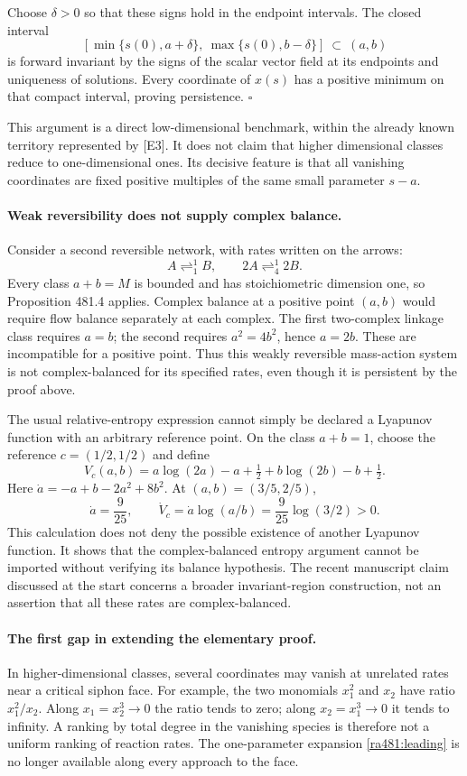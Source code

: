 \documentclass[11pt]{article}
\begin{document}
Choose $\delta>0$ so that these signs hold in the endpoint intervals.
The closed interval
\[
 [\min\{s(0),a+\delta\},\ \max\{s(0),b-\delta\}]
 \ \subset\ (a,b)
\]
is forward invariant by the signs of the scalar vector field at its
endpoints and uniqueness of solutions. Every coordinate of $x(s)$ has
a positive minimum on that compact interval, proving persistence.
\hfill$\square$

This argument is a direct low-dimensional benchmark, within the already
known territory represented by [E3]. It does not claim that higher
dimensional classes reduce to one-dimensional ones. Its decisive feature
is that all vanishing coordinates are fixed positive multiples of the
same small parameter $s-a$.

\paragraph{Weak reversibility does not supply complex balance.}
Consider a second reversible network, with rates written on the arrows:
\[
 A\mathop{\rightleftharpoons}^{1}_{1}B,
 \qquad
 2A\mathop{\rightleftharpoons}^{1}_{4}2B.
\]
Every class $a+b=M$ is bounded and has stoichiometric dimension one, so
Proposition 481.4 applies. Complex balance at a positive point $(a,b)$
would require flow balance separately at each complex. The first
two-complex linkage class requires $a=b$; the second requires
$a^2=4b^2$, hence $a=2b$. These are incompatible for a positive point.
Thus this weakly reversible mass-action system is not complex-balanced
for its specified rates, even though it is persistent by the proof above.

The usual relative-entropy expression cannot simply be declared a
Lyapunov function with an arbitrary reference point. On the class
$a+b=1$, choose the reference $c=(1/2,1/2)$ and define
\[
 V_c(a,b)=a\log(2a)-a+\tfrac12
                  +b\log(2b)-b+\tfrac12.
\]
Here $\dot a=-a+b-2a^2+8b^2$. At $(a,b)=(3/5,2/5)$,
\[
 \dot a=\frac9{25},\qquad
 \dot V_c=\dot a\log(a/b)=\frac9{25}\log(3/2)>0.
\]
This calculation does not deny the possible existence of another
Lyapunov function. It shows that the complex-balanced entropy argument
cannot be imported without verifying its balance hypothesis. The recent
manuscript claim discussed at the start concerns a broader invariant-region
construction, not an assertion that all these rates are complex-balanced.

\paragraph{The first gap in extending the elementary proof.}
In higher-dimensional classes, several coordinates may vanish at
unrelated rates near a critical siphon face. For example, the two
monomials $x_1^2$ and $x_2$ have ratio $x_1^2/x_2$. Along
$x_1=x_2^3\to0$ the ratio tends to zero; along
$x_2=x_1^3\to0$ it tends to infinity. A ranking by total degree in
the vanishing species is therefore not a uniform ranking of reaction
rates. The one-parameter expansion \eqref{ra481:leading} is no longer
available along every approach to the face.
\end{document}
